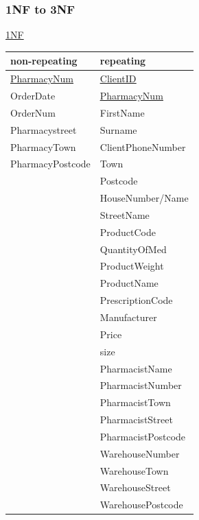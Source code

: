 \subsubsection{1NF to 3NF}
\underline{1NF}
\begin{table}[H]
\begin{tabular}{|l|l|}
\hline
\textbf{non-repeating} & \textbf{repeating} \\
\hline
\underline{PharmacyNum}&\underline{\underline{ClientID}}\\\hline
 OrderDate             &\underline{ \underline{PharmacyNum}} \\\hline
 OrderNum              & FirstName          \\\hline
 Pharmacystreet        & Surname            \\\hline
 PharmacyTown          & ClientPhoneNumber  \\\hline
 PharmacyPostcode      & Town               \\\hline
                       & Postcode           \\\hline
							  & HouseNumber/Name   \\\hline
							  & StreetName         \\\hline
                       & ProductCode        \\\hline
						     & QuantityOfMed      \\\hline
                       & ProductWeight      \\\hline
                       & ProductName        \\\hline
							  & PrescriptionCode   \\\hline
  							  & Manufacturer       \\\hline
							  & Price              \\\hline
&size\\\hline
&PharmacistName\\\hline
&PharmacistNumber\\\hline
&PharmacistTown     \\\hline
&PharmacistStreet   \\\hline
&PharmacistPostcode \\\hline
&WarehouseNumber\\\hline
&WarehouseTown \\\hline
&WarehouseStreet\\\hline
&WarehousePostcode\\\hline
\end{tabular}
\end{table}

